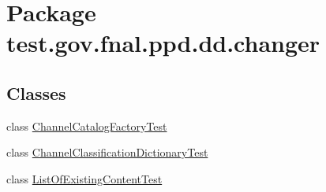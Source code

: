 \hypertarget{namespacetest_1_1gov_1_1fnal_1_1ppd_1_1dd_1_1changer}{\section{Package test.\-gov.\-fnal.\-ppd.\-dd.\-changer}
\label{namespacetest_1_1gov_1_1fnal_1_1ppd_1_1dd_1_1changer}
}
\subsection*{Classes}
\begin{DoxyCompactItemize}
\item 
class \hyperlink{classtest_1_1gov_1_1fnal_1_1ppd_1_1dd_1_1changer_1_1ChannelCatalogFactoryTest}{Channel\-Catalog\-Factory\-Test}
\item 
class \hyperlink{classtest_1_1gov_1_1fnal_1_1ppd_1_1dd_1_1changer_1_1ChannelClassificationDictionaryTest}{Channel\-Classification\-Dictionary\-Test}
\item 
class \hyperlink{classtest_1_1gov_1_1fnal_1_1ppd_1_1dd_1_1changer_1_1ListOfExistingContentTest}{List\-Of\-Existing\-Content\-Test}
\end{DoxyCompactItemize}
